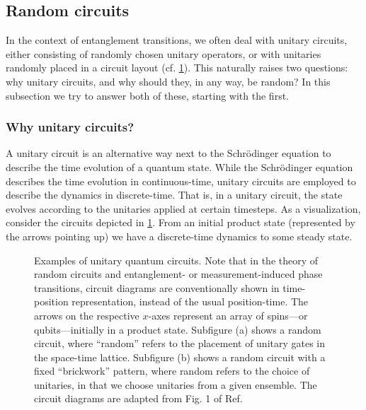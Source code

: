 \subsection{Random circuits}\label{sec:randomcircuits}

In the context of entanglement transitions, we often deal with unitary
circuits, either consisting of randomly chosen unitary operators, or with unitaries
randomly placed in a circuit layout (cf. \cref{fig:random-brickwork}). This
naturally raises two questions: why unitary circuits, and why should they, in
any way, be random? In this subsection we try to answer both of these, starting
with the first.

\subsubsection{Why unitary circuits?}

A unitary circuit is an alternative way next to the Schr\"odinger equation to
describe the time evolution of a quantum state. While the Schr\"odinger
equation describes the time evolution in continuous-time, unitary circuits are
employed to describe the dynamics in discrete-time. That is, in a unitary
circuit, the state evolves according to the unitaries applied at certain
timesteps. As a visualization, consider the circuits depicted in
\cref{fig:random-brickwork}. From an initial product state (represented by the
arrows pointing up) we have a discrete-time dynamics to some steady state.
%
\begin{figure}[t]
  \centering
  \begin{subfigure}{0.42\textwidth}
    
  \end{subfigure}
  \hfill
  \begin{subfigure}{0.42\textwidth}
    
  \end{subfigure}
  \caption{Examples of unitary quantum circuits. Note that in the theory of
    random circuits and entanglement- or measurement-induced phase transitions,
    circuit diagrams are conventionally shown in time-position representation,
    instead of the usual position-time. The arrows on the respective $x$-axes
    represent an array of spins---or qubits---initially in a product state.
    Subfigure (a) shows a random circuit,
    where \enquote{random} refers to the placement of unitary gates in the
    space-time lattice. Subfigure (b) shows a random circuit with a fixed
    \enquote{brickwork} pattern, where random refers to the choice of
    unitaries, in that we choose unitaries from a given ensemble. The circuit
    diagrams are adapted from Fig. 1 of Ref. \cite{skinnerLectureNotesIntroduction2023}}
  \label{fig:random-brickwork}
\end{figure}
%

